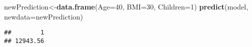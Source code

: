 \documentclass[
]{article}
\newenvironment{Shaded}{\begin{snugshade}}{\end{snugshade}}
\newcommand{\AttributeTok}[1]{\textcolor[rgb]{0.13,0.29,0.53}{#1}}
\newcommand{\DecValTok}[1]{\textcolor[rgb]{0.00,0.00,0.81}{#1}}
\newcommand{\FunctionTok}[1]{\textcolor[rgb]{0.13,0.29,0.53}{\textbf{#1}}}
\newcommand{\NormalTok}[1]{#1}
\newcommand{\OtherTok}[1]{\textcolor[rgb]{0.56,0.35,0.01}{#1}}
\begin{document}
\begin{Shaded}
\begin{Highlighting}[]
\NormalTok{newPrediction}\OtherTok{\textless{}{-}}\FunctionTok{data.frame}\NormalTok{(}\AttributeTok{Age=}\DecValTok{40}\NormalTok{,}
                          \AttributeTok{BMI=}\DecValTok{30}\NormalTok{,}
                          \AttributeTok{Children=}\DecValTok{1}\NormalTok{)}
\FunctionTok{predict}\NormalTok{(model, }\AttributeTok{newdata=}\NormalTok{newPrediction)}
\end{Highlighting}
\end{Shaded}

\begin{verbatim}
##        1 
## 12943.56
\end{verbatim}
\end{document}
